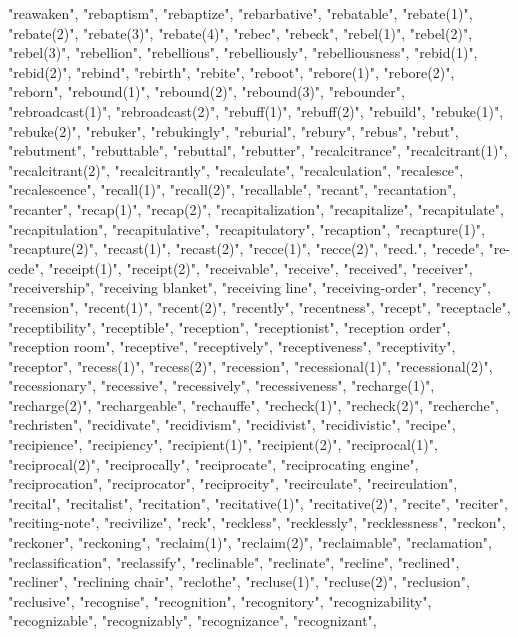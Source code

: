 "reawaken",
"rebaptism",
"rebaptize",
"rebarbative",
"rebatable",
"rebate(1)",
"rebate(2)",
"rebate(3)",
"rebate(4)",
"rebec",
"rebeck",
"rebel(1)",
"rebel(2)",
"rebel(3)",
"rebellion",
"rebellious",
"rebelliously",
"rebelliousness",
"rebid(1)",
"rebid(2)",
"rebind",
"rebirth",
"rebite",
"reboot",
"rebore(1)",
"rebore(2)",
"reborn",
"rebound(1)",
"rebound(2)",
"rebound(3)",
"rebounder",
"rebroadcast(1)",
"rebroadcast(2)",
"rebuff(1)",
"rebuff(2)",
"rebuild",
"rebuke(1)",
"rebuke(2)",
"rebuker",
"rebukingly",
"reburial",
"rebury",
"rebus",
"rebut",
"rebutment",
"rebuttable",
"rebuttal",
"rebutter",
"recalcitrance",
"recalcitrant(1)",
"recalcitrant(2)",
"recalcitrantly",
"recalculate",
"recalculation",
"recalesce",
"recalescence",
"recall(1)",
"recall(2)",
"recallable",
"recant",
"recantation",
"recanter",
"recap(1)",
"recap(2)",
"recapitalization",
"recapitalize",
"recapitulate",
"recapitulation",
"recapitulative",
"recapitulatory",
"recaption",
"recapture(1)",
"recapture(2)",
"recast(1)",
"recast(2)",
"recce(1)",
"recce(2)",
"recd.",
"recede",
"re-cede",
"receipt(1)",
"receipt(2)",
"receivable",
"receive",
"received",
"receiver",
"receivership",
"receiving blanket",
"receiving line",
"receiving-order",
"recency",
"recension",
"recent(1)",
"recent(2)",
"recently",
"recentness",
"recept",
"receptacle",
"receptibility",
"receptible",
"reception",
"receptionist",
"reception order",
"reception room",
"receptive",
"receptively",
"receptiveness",
"receptivity",
"receptor",
"recess(1)",
"recess(2)",
"recession",
"recessional(1)",
"recessional(2)",
"recessionary",
"recessive",
"recessively",
"recessiveness",
"recharge(1)",
"recharge(2)",
"rechargeable",
"rechauffe",
"recheck(1)",
"recheck(2)",
"recherche",
"rechristen",
"recidivate",
"recidivism",
"recidivist",
"recidivistic",
"recipe",
"recipience",
"recipiency",
"recipient(1)",
"recipient(2)",
"reciprocal(1)",
"reciprocal(2)",
"reciprocally",
"reciprocate",
"reciprocating engine",
"reciprocation",
"reciprocator",
"reciprocity",
"recirculate",
"recirculation",
"recital",
"recitalist",
"recitation",
"recitative(1)",
"recitative(2)",
"recite",
"reciter",
"reciting-note",
"recivilize",
"reck",
"reckless",
"recklessly",
"recklessness",
"reckon",
"reckoner",
"reckoning",
"reclaim(1)",
"reclaim(2)",
"reclaimable",
"reclamation",
"reclassification",
"reclassify",
"reclinable",
"reclinate",
"recline",
"reclined",
"recliner",
"reclining chair",
"reclothe",
"recluse(1)",
"recluse(2)",
"reclusion",
"reclusive",
"recognise",
"recognition",
"recognitory",
"recognizability",
"recognizable",
"recognizably",
"recognizance",
"recognizant",
